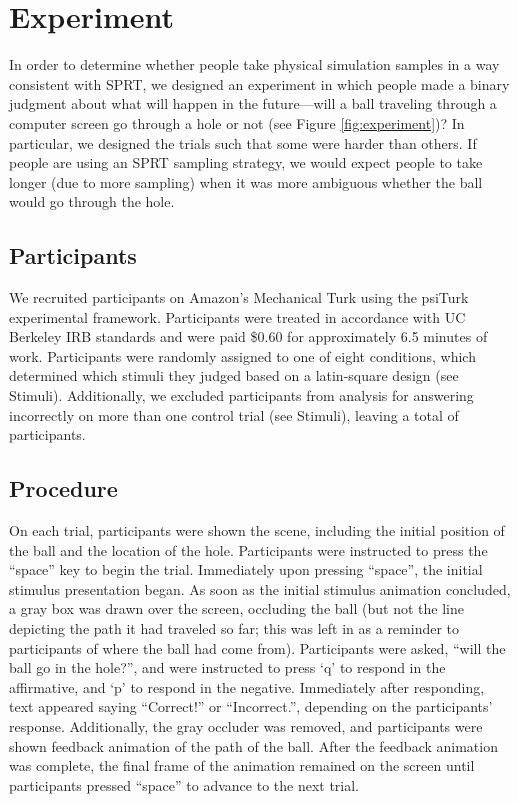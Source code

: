 \documentclass[10pt,letterpaper]{article}
\begin{document}
\section{Experiment}

In order to determine whether people take physical simulation samples in a way consistent with SPRT, we designed an experiment in which people made a binary judgment about what will happen in the future---will a ball traveling through a computer screen go through a hole or not (see Figure \ref{fig:experiment})? In particular, we designed the trials such that some were harder than others. If people are using an SPRT sampling strategy, we would expect people to take longer (due to more sampling) when it was more ambiguous whether the ball would go through the hole.

\subsection{Participants}

We recruited \HoleNumComplete{} participants on Amazon's Mechanical Turk using the psiTurk \cite{McDonnell12} experimental framework. Participants were treated in accordance with UC Berkeley IRB standards and were paid \$0.60 for approximately 6.5 minutes of work. Participants were randomly assigned to one of eight conditions, which determined which stimuli they judged based on a latin-square design (see Stimuli). Additionally, we excluded \HoleNumFailed{} participants from analysis for answering incorrectly on more than one control trial (see Stimuli), leaving a total of \HoleNumOk{} participants.

\subsection{Procedure}

On each trial, participants were shown the scene, including the initial position of the ball and the location of the hole. Participants were instructed to press the ``space'' key to begin the trial. Immediately upon pressing ``space'', the initial stimulus presentation began. As soon as the initial stimulus animation concluded, a gray box was drawn over the screen, occluding the ball (but not the line depicting the path it had traveled so far; this was left in as a reminder to participants of where the ball had come from). Participants were asked, ``will the ball go in the hole?'', and were instructed to press `q' to respond in the affirmative, and `p' to respond in the negative. Immediately after responding, text appeared saying ``Correct!'' or ``Incorrect.'', depending on the participants' response. Additionally, the gray occluder was removed, and participants were shown feedback animation of the path of the ball. After the feedback animation was complete, the final frame of the animation remained on the screen until participants pressed ``space'' to advance to the next trial. 
\end{document}
